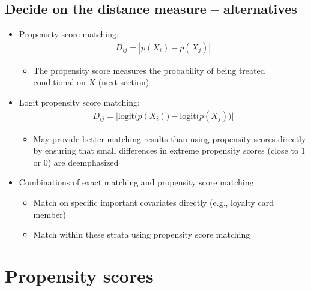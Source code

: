 \documentclass[10pt]{article}
\begin{document}
\subsection{Decide on the distance measure -- alternatives}
\begin{itemize}
    \item Propensity score matching: 
    \begin{gather*}
        D_{ij} = |p(X_i) - p(X_j)|
    \end{gather*}
    \begin{itemize}
        \item The propensity score measures the probability of being treated conditional on $X $ (next section)
    \end{itemize}
    \item Logit propensity score matching:
    \begin{gather*}
        D_{ij} = \Big|\text{logit}\big(p(X_i)\big) - \text{logit}\big(p(X_j)\big)\Big|
    \end{gather*}
    \begin{itemize}
        \item May provide better matching results than using propensity scores directly by ensuring that small differences in extreme propensity scores (close to 1 or 0) are deemphasized
    \end{itemize}
    \item Combinations of exact matching and propensity score matching 
    \begin{itemize}
        \item Match on specific important covariates directly (e.g., loyalty card member)
        \item Match within these strata using propensity score matching 
    \end{itemize}
\end{itemize}
\newpage 
\section{Propensity scores}
\end{document}

